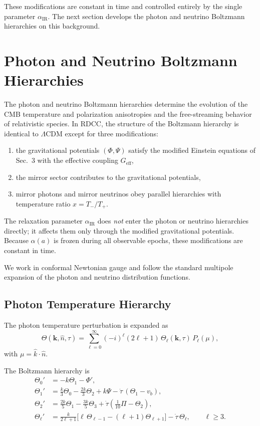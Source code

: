 \documentclass[11pt,a4paper]{article}
\begin{document}
These modifications are constant in time and controlled entirely by the single parameter
$\alpha_{\mathrm{IR}}$. The next section develops the photon and neutrino Boltzmann hierarchies
on this background.

\section{Photon and Neutrino Boltzmann Hierarchies}

The photon and neutrino Boltzmann hierarchies determine the evolution of the CMB
temperature and polarization anisotropies and the free-streaming behavior of relativistic
species. In RDCC, the structure of the Boltzmann hierarchy is identical to $\Lambda$CDM
except for three modifications:

\begin{enumerate}
    \item the gravitational potentials $(\Phi,\Psi)$ satisfy the modified Einstein equations of
    Sec.~3 with the effective coupling $G_{\mathrm{eff}}$,
    \item the mirror sector contributes to the gravitational potentials,
    \item mirror photons and mirror neutrinos obey parallel hierarchies with temperature
    ratio $x = T_{-}/T_{+}$.
\end{enumerate}

The relaxation parameter $\alpha_{\mathrm{IR}}$ does \emph{not} enter the photon or neutrino hierarchies
directly; it affects them only through the modified gravitational potentials. Because
$\alpha(a)$ is frozen during all observable epochs, these modifications are constant in time.

We work in conformal Newtonian gauge and follow the standard multipole expansion of the
photon and neutrino distribution functions.

\subsection{Photon Temperature Hierarchy}

The photon temperature perturbation is expanded as
\begin{equation}
    \Theta(\mathbf{k},\hat{n},\tau)
    = \sum_{\ell=0}^{\infty} (-i)^{\ell} (2\ell+1)\,\Theta_{\ell}(\mathbf{k},\tau)\,P_{\ell}(\mu),
\end{equation}
with $\mu = \hat{k}\!\cdot\!\hat{n}$.

The Boltzmann hierarchy is
\begin{align}
    \Theta_{0}' &= -k\Theta_{1} - \Phi', \\
    \Theta_{1}' &= \frac{k}{3}\Theta_{0} - \frac{2k}{3}\Theta_{2} + k\Psi - \dot{\tau}\,(\Theta_{1} - v_{b}), \\
    \Theta_{2}' &= \frac{2k}{5}\Theta_{1} - \frac{3k}{5}\Theta_{3}
                  + \dot{\tau}\left(\frac{1}{10}\Pi - \Theta_{2}\right), \\
    \Theta_{\ell}' &= \frac{k}{2\ell+1}\bigl[\ell\,\Theta_{\ell-1} - (\ell+1)\Theta_{\ell+1}\bigr]
                     - \dot{\tau}\,\Theta_{\ell}, \qquad \ell \ge 3.
\end{align}
\end{document}
